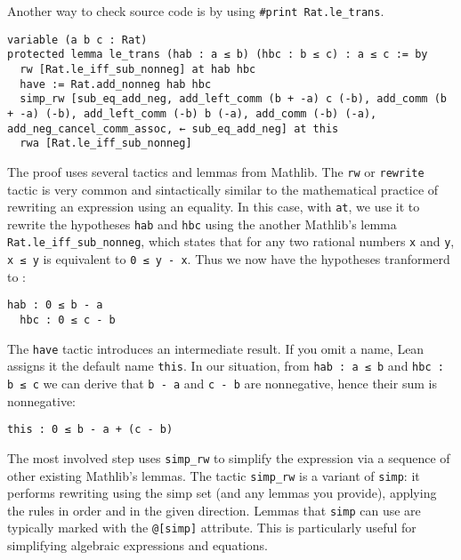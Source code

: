 Another way to check source code is by using \lstinline[language=lean]|#print Rat.le_trans|.
\begin{lstlisting}[language=lean]
variable (a b c : Rat)
protected lemma le_trans (hab : a ≤ b) (hbc : b ≤ c) : a ≤ c := by
  rw [Rat.le_iff_sub_nonneg] at hab hbc
  have := Rat.add_nonneg hab hbc
  simp_rw [sub_eq_add_neg, add_left_comm (b + -a) c (-b), add_comm (b + -a) (-b), add_left_comm (-b) b (-a), add_comm (-b) (-a), add_neg_cancel_comm_assoc, ← sub_eq_add_neg] at this
  rwa [Rat.le_iff_sub_nonneg]
\end{lstlisting}
The proof uses several tactics and lemmas from Mathlib.
The \lstinline[language=lean]|rw| or \lstinline[language=lean]|rewrite| tactic  
is very common and sintactically similar to
the mathematical practice of rewriting an expression using an equality.
In this case, with \lstinline[language=lean]|at|, we use it to rewrite the 
hypotheses \lstinline[language=lean]|hab| 
and \lstinline[language=lean]|hbc|
using the another Mathlib's lemma \lstinline[language=lean]|Rat.le_iff_sub_nonneg|, 
which states that for any two rational numbers \lstinline[language=lean]|x| and
\lstinline[language=lean]|y|, \lstinline[language=lean]|x ≤ y| 
is equivalent to \lstinline[language=lean]|0 ≤ y - x|.
Thus we now have the hypotheses tranformerd to :  
\begin{lstlisting}[language=lean]
  hab : 0 ≤ b - a
  hbc : 0 ≤ c - b
\end{lstlisting}
The \lstinline[language=lean]|have| tactic introduces an intermediate result. 
If you omit a name, Lean assigns it the default name \lstinline[language=lean]|this|. 
In our situation, from \lstinline[language=lean]|hab : a ≤ b| and \lstinline[language=lean]|hbc : b ≤ c| 
we can derive that \lstinline[language=lean]|b - a| and \lstinline[language=lean]|c - b| 
are nonnegative, hence their sum is nonnegative:
\begin{lstlisting}[language=lean]
  this : 0 ≤ b - a + (c - b)
\end{lstlisting}
The most involved step uses \lstinline[language=lean]|simp_rw| to 
simplify the expression via a sequence of other existing Mathlib's lemmas. 
The tactic \lstinline[language=lean]|simp_rw| is a variant of \lstinline[language=lean]|simp|: 
it performs rewriting using the simp set (and any lemmas you provide), applying the rules 
in order and in the given direction. Lemmas that \lstinline[language=lean]|simp| can use 
are typically marked with the \lstinline[language=lean]|@[simp]| attribute. 
This is particularly useful for simplifying algebraic expressions and equations.
